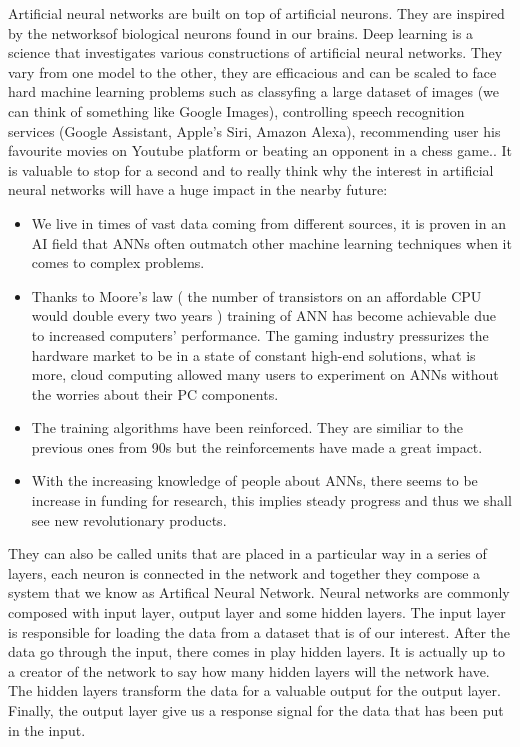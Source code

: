 \documentclass[a4paper,oneside,openright,11pt]{book}
\begin{document}
Artificial neural networks are built on top of artificial neurons. They are inspired by the networksof biological neurons found in our brains. Deep learning is a science that investigates various constructions of
artificial neural networks. They vary from one model to the other, they are efficacious and can be scaled to face hard machine learning problems such as classyfing a large dataset of images (we can think of something like Google Images), controlling speech recognition services (Google Assistant, Apple's Siri, Amazon Alexa), recommending user his favourite movies on Youtube platform or beating an opponent in a chess game.\cite{aurelion}\cite{DeepLearningChess}. It is valuable to stop for a second and to really think why the interest in artificial neural networks will have a huge impact in the nearby future: 
 
\begin{itemize}
    \item We live in times of vast data coming from different sources, it is proven in an AI field that ANNs often outmatch other machine learning techniques when it comes to complex problems.
    \item Thanks to Moore's law ( the number of transistors on an affordable CPU would double every two years \cite{intel}) training of ANN has become achievable due to increased computers' performance. The gaming industry pressurizes the hardware market to be in a state of constant high-end solutions, what is more, cloud computing allowed many users to experiment on ANNs without the worries about their PC components.
    \item The training algorithms have been reinforced. They are similiar to the previous ones from 90s but the reinforcements have made a great impact.
    \item With the increasing knowledge of people about ANNs, there seems to be increase in funding for research, this implies steady progress and thus we shall see new revolutionary products.
\end{itemize}




They can also be called units that are placed in a particular way in a series of layers, each neuron is connected in the network and together they compose a system that we know as Artifical Neural Network. Neural networks are commonly composed with input layer, output layer and some hidden layers. The input layer is responsible for loading the data from a dataset that is of our interest. After the data go through the input, there comes in play hidden layers. It is actually up to a creator of the network to say how many hidden layers will the network have. The hidden layers transform the data for a valuable output for the output layer. Finally, the output layer give us a response signal for the data that has been put in the input. 
\end{document}
